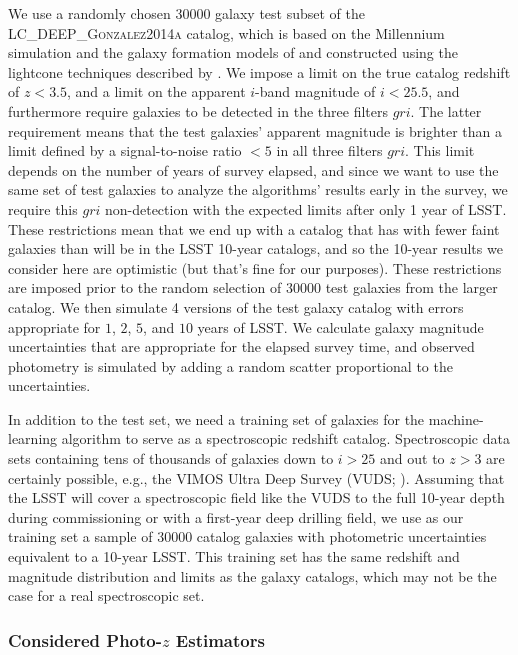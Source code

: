 \documentclass[DM,lsstdraft,toc]{lsstdoc}
\begin{document}
We use a randomly chosen 30000 galaxy test subset of the \textsc{LC\_DEEP\_Gonzalez2014a} catalog, which is based on the Millennium simulation \citep{2005Natur.435..629S} and the galaxy formation models of \cite{2014MNRAS.439..264G} and constructed using the lightcone techniques described by \cite{2013MNRAS.429..556M}. We impose a limit on the true catalog redshift of $z<3.5$, and a limit on the apparent $i$-band magnitude of $i<25.5$, and furthermore require galaxies to be detected in the three filters $gri$. The latter requirement means that the test galaxies' apparent magnitude is brighter than a limit defined by a signal-to-noise ratio $<5$ in all three filters $gri$. This limit depends on the number of years of survey elapsed, and since we want to use the same set of test galaxies to analyze the algorithms' results early in the survey, we require this $gri$ non-detection with the expected limits after only 1 year of LSST. These restrictions mean that we end up with a catalog that has with fewer faint galaxies than will be in the LSST 10-year catalogs, and so the 10-year results we consider here are optimistic (but that's fine for our purposes). These restrictions are imposed prior to the random selection of 30000 test galaxies from the larger catalog. We then simulate 4 versions of the test galaxy catalog with errors appropriate for $1$, $2$, $5$, and $10$ years of LSST. We calculate galaxy magnitude uncertainties that are appropriate for the elapsed survey time, and observed photometry is simulated by adding a random scatter proportional to the uncertainties.

In addition to the test set, we need a training set of galaxies for the machine-learning algorithm to serve as a spectroscopic redshift catalog. Spectroscopic data sets containing tens of thousands of galaxies down to $i>25$ and out to $z>3$ are certainly possible, e.g., the VIMOS Ultra Deep Survey (VUDS; \citealt{2015A&A...576A..79L}). Assuming that the LSST will cover a spectroscopic field like the VUDS to the full 10-year depth during commissioning or with a first-year deep drilling field, we use as our training set a sample of 30000 catalog galaxies with photometric uncertainties equivalent to a 10-year LSST. This training set has the same redshift and magnitude distribution and limits as the galaxy catalogs, which may not be the case for a real spectroscopic set.

\subsubsection{Considered Photo-$z$ Estimators}\label{sssec:eval_ex_estimators}
\end{document}
